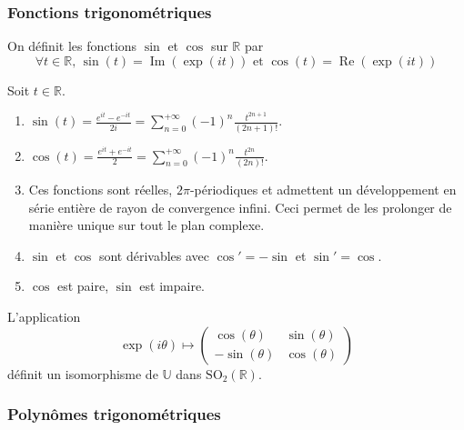   \subsubsection{Fonctions trigonométriques}

  \begin{definition}
    On définit les fonctions $\sin$ et $\cos$ sur $\mathbb{R}$ par
    \[ \forall t \in \mathbb{R}, \, \sin(t) = \operatorname{Im}(\exp(it)) \text{ et } \cos(t) = \operatorname{Re}(\exp(it)) \]
  \end{definition}


  \begin{proposition}
    Soit $t \in \mathbb{R}$.
    \begin{enumerate}[label={\bfseries(\roman*)}]
      \item $\sin(t) = \frac{e^{it} - e^{-it}}{2i} = \sum_{n=0}^{+\infty} (-1)^n\frac{t^{2n+1}}{(2n+1)!}$.
      \item $\cos(t) = \frac{e^{it} + e^{-it}}{2} = \sum_{n=0}^{+\infty} (-1)^n\frac{t^{2n}}{(2n)!}$.
      \item Ces fonctions sont réelles, $2\pi$-périodiques et admettent un développement en série entière de rayon de convergence infini. Ceci permet de les prolonger de manière unique sur tout le plan complexe.
      \item $\sin$ et $\cos$ sont dérivables avec $\cos' = -\sin$ et $\sin' = \cos$.
      \item $\cos$ est paire, $\sin$ est impaire.
    \end{enumerate}
  \end{proposition}


  \begin{proposition}
    L'application
    \[ \exp(i\theta) \mapsto
    \begin{pmatrix}
      \cos(\theta) & \sin(\theta) \\
      -\sin(\theta) & \cos(\theta)
    \end{pmatrix}
    \]
    définit un isomorphisme de $\mathbb{U}$ dans $\mathrm{SO}_2(\mathbb{R})$.
  \end{proposition}

  \subsubsection{Polynômes trigonométriques}


